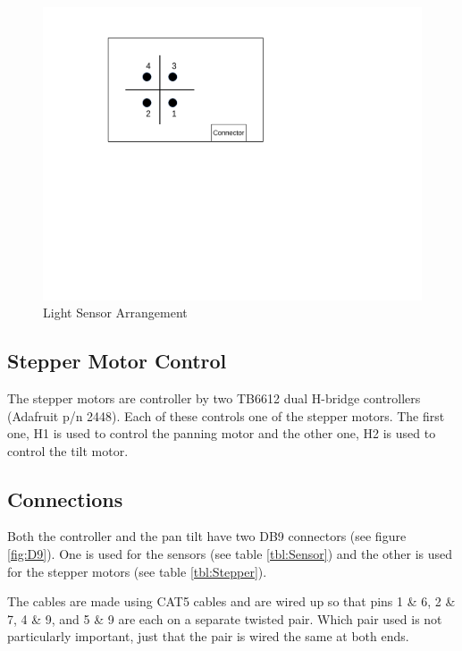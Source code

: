 \documentclass[10pt, openany]{book}
\begin{document}
\begin{figure}[htb]
  \begin{center}
    \includegraphics[scale=0.5]{Sensors.pdf}
    \caption{Light Sensor Arrangement}
    \label{fig:Sensors}
  \end{center}
\end{figure}

\subsection{Stepper Motor Control}
The stepper motors are controller by two TB6612 dual H-bridge controllers (Adafruit p/n 2448).  Each of these controls one of the stepper motors.  The first one, H1 is used to control the panning motor and the other one, H2 is used to control the tilt motor.

\subsection{Connections}
Both the controller and the pan tilt have two DB9 connectors (see figure \ref{fig:D9}).  One is used for the sensors (see table \ref{tbl:Sensor}) and the other is used for the stepper motors (see table \ref{tbl:Stepper}).

The cables are made using CAT5 cables and are wired up so that pins 1 \& 6, 2 \& 7, 4 \& 9, and 5 \& 9 are each on a separate twisted pair.  Which pair used is not particularly important, just that the pair is wired the same at both ends.
\end{document}
